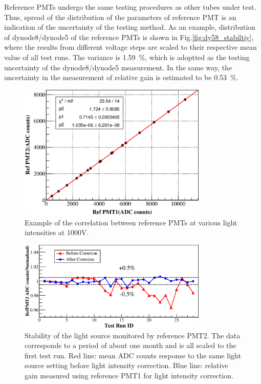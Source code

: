 \documentclass[5p, times]{elsarticle}
\begin{document}
Reference PMTs undergo the same testing procedures as other tubes under test.
Thus, spread of the distribution of the parameters of reference PMT is an indication of the uncertainty of the testing method.
As an example, distribution of dynode8/dynode5 of the reference PMTs is shown in Fig.\ref{fig:dy58_stabiltiy}, where the results from different voltage steps are scaled to their respective mean value of all test runs.
The variance is \SI{1.59}{\percent}, which is adoptted as the testing uncertainty of the dynode8/dynode5 measurement.
In the same way, the uncertainty in the measurement of relative gain is estimated to be \SI{0.53}{\percent}. 

\begin{figure}[h!]
 \centering
 \includegraphics[width=90mm]{RelativeGainRef}
\caption{Example of the correlation between reference PMTs at various light intensities at 1000V.}
\label{fig:refgain_relation}
\end{figure} 

\begin{figure}[h!]
 \centering
 \includegraphics[width=90mm]{led_stability}
\caption{Stability of the light source monitored by reference PMT2.
The data corresponds to a period of about one month and is all scaled to the first test run.
Red line: mean ADC counts response to the same light source setting before light intensity correction.
Blue line: relative gain measured using reference PMT1 for light intensity correction.}
\label{fig:led_stability}
\end{figure} 
\end{document}
